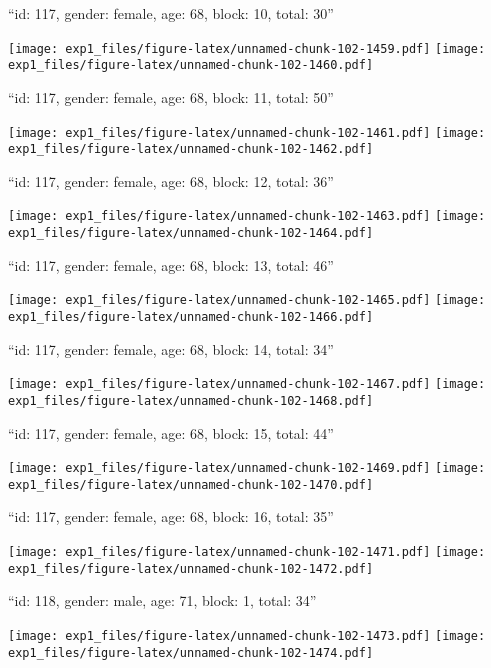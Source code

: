 \documentclass[11pt,,]{article}
\begin{document}
\newpage
[1] 

``id: 117, gender: female, age: 68, block: 10, total: 30''

\texttt{[image: exp1\_files/figure-latex/unnamed-chunk-102-1459.pdf]}
\texttt{[image: exp1\_files/figure-latex/unnamed-chunk-102-1460.pdf]}

\newpage
[1] 

``id: 117, gender: female, age: 68, block: 11, total: 50''

\texttt{[image: exp1\_files/figure-latex/unnamed-chunk-102-1461.pdf]}
\texttt{[image: exp1\_files/figure-latex/unnamed-chunk-102-1462.pdf]}

\newpage
[1] 

``id: 117, gender: female, age: 68, block: 12, total: 36''

\texttt{[image: exp1\_files/figure-latex/unnamed-chunk-102-1463.pdf]}
\texttt{[image: exp1\_files/figure-latex/unnamed-chunk-102-1464.pdf]}

\newpage
[1] 

``id: 117, gender: female, age: 68, block: 13, total: 46''

\texttt{[image: exp1\_files/figure-latex/unnamed-chunk-102-1465.pdf]}
\texttt{[image: exp1\_files/figure-latex/unnamed-chunk-102-1466.pdf]}

\newpage
[1] 

``id: 117, gender: female, age: 68, block: 14, total: 34''

\texttt{[image: exp1\_files/figure-latex/unnamed-chunk-102-1467.pdf]}
\texttt{[image: exp1\_files/figure-latex/unnamed-chunk-102-1468.pdf]}

\newpage
[1] 

``id: 117, gender: female, age: 68, block: 15, total: 44''

\texttt{[image: exp1\_files/figure-latex/unnamed-chunk-102-1469.pdf]}
\texttt{[image: exp1\_files/figure-latex/unnamed-chunk-102-1470.pdf]}

\newpage
[1] 

``id: 117, gender: female, age: 68, block: 16, total: 35''

\texttt{[image: exp1\_files/figure-latex/unnamed-chunk-102-1471.pdf]}
\texttt{[image: exp1\_files/figure-latex/unnamed-chunk-102-1472.pdf]}

\newpage
[1] 

``id: 118, gender: male, age: 71, block: 1, total: 34''

\texttt{[image: exp1\_files/figure-latex/unnamed-chunk-102-1473.pdf]}
\texttt{[image: exp1\_files/figure-latex/unnamed-chunk-102-1474.pdf]}
\end{document}
